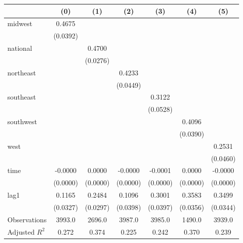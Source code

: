 \begin{tabular}{lcccccc}
\toprule
 & (0) & (1) & (2) & (3) & (4) & (5) \\
\midrule
midwest & 0.4675 &  &  &  &  &  \\
\vspace{0.2cm}
 & (0.0392) &  &  &  &  &  \\
national &  & 0.4700 &  &  &  &  \\
\vspace{0.2cm}
 &  & (0.0276) &  &  &  &  \\
northeast &  &  & 0.4233 &  &  &  \\
\vspace{0.2cm}
 &  &  & (0.0449) &  &  &  \\
southeast &  &  &  & 0.3122 &  &  \\
\vspace{0.2cm}
 &  &  &  & (0.0528) &  &  \\
southwest &  &  &  &  & 0.4096 &  \\
\vspace{0.2cm}
 &  &  &  &  & (0.0390) &  \\
west &  &  &  &  &  & 0.2531 \\
\vspace{0.2cm}
 &  &  &  &  &  & (0.0460) \\
time & -0.0000 & 0.0000 & -0.0000 & -0.0001 & 0.0000 & -0.0000 \\
\vspace{0.2cm}
 & (0.0000) & (0.0000) & (0.0000) & (0.0000) & (0.0000) & (0.0000) \\
lag1 & 0.1165 & 0.2484 & 0.1096 & 0.3001 & 0.3583 & 0.3499 \\
\vspace{0.2cm}
 & (0.0327) & (0.0297) & (0.0398) & (0.0397) & (0.0356) & (0.0344) \\
\midrule
Observations & 3993.0 & 2696.0 & 3987.0 & 3985.0 & 1490.0 & 3939.0 \\
Adjusted $R^2$ & 0.272 & 0.374 & 0.225 & 0.242 & 0.370 & 0.239 \\
\bottomrule
\end{tabular}